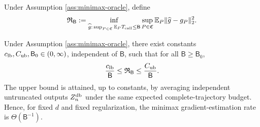 Under Assumption \ref{ass:minimax-oracle}, define
\begin{equation}\label{eq:minimax-risk}
 \mathfrak R_{\mathsf B}
 :=\inf_{\widehat g:\,\sup_{P\in\mathfrak C}\mathbb E_P T_{\rm call}\le\mathsf B}
 \sup_{P\in\mathfrak C}
 \mathbb E_P\lVert\widehat g-g_P\rVert_2^2.
\end{equation}

\begin{theorem}\label{thm:minimax}
Under Assumption \ref{ass:minimax-oracle}, there exist constants
$c_{\rm lb},C_{\rm ub},\mathsf B_0\in(0,\infty)$, independent of $\mathsf B$, such that for all $\mathsf B\ge\mathsf B_0$,
\begin{equation}\label{eq:minimax-rate}
 \frac{c_{\rm lb}}{\mathsf B}
 \le \mathfrak R_{\mathsf B}
 \le \frac{C_{\rm ub}}{\mathsf B}.
\end{equation}
The upper bound is attained, up to constants, by averaging independent untruncated outputs $Z_n^{\mathrm{db}}$ under the same expected complete-trajectory budget.  Hence, for fixed $d$ and fixed regularization, the minimax gradient-estimation rate is $\Theta(\mathsf B^{-1})$.
\end{theorem}
